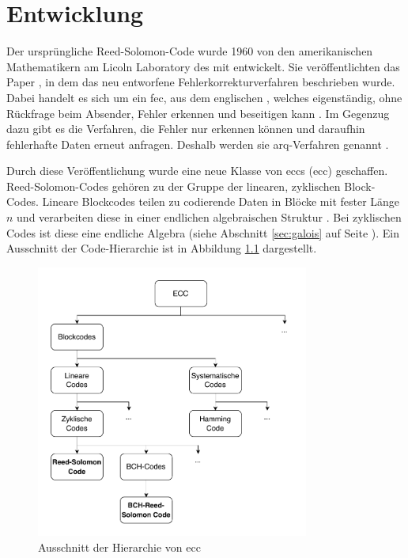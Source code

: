 \chapter{Entwicklung}\label{ch:development}

Der ursprüngliche Reed-Solomon-Code wurde 1960 von den amerikanischen Mathematikern am Licoln Laboratory des \acrshort{mit} entwickelt.
Sie veröffentlichten das Paper , in dem das neu entworfene Fehlerkorrekturverfahren beschrieben wurde.
Dabei handelt es sich um ein \acrfull{fec}, aus dem englischen , welches eigenständig, ohne Rückfrage beim Absender, Fehler erkennen und beseitigen kann \cite[Kapitel 1.1]{friedrichsKanalcodierung1996}.
Im Gegenzug dazu gibt es die Verfahren, die Fehler nur erkennen können und daraufhin fehlerhafte Daten erneut anfragen. Deshalb werden sie \acrfull{arq}-Verfahren genannt \cite[Kapitel 2.1]{geiselTutorialReedSolomonError1990}.

Durch diese Veröffentlichung wurde eine neue Klasse von \acrlong{ecc}s (\acrshort{ecc}) geschaffen. 
Reed-Solomon-Codes gehören zu der Gruppe der linearen, zyklischen Block-Codes. 
Lineare Blockcodes teilen zu codierende Daten in Blöcke mit fester Länge \(n\) und verarbeiten diese in einer endlichen algebraischen Struktur \cite[Kapitel 3]{friedrichsKanalcodierung1996}. 
Bei zyklischen Codes ist diese eine endliche Algebra (siehe Abschnitt \ref{sec:galois} auf Seite \pageref{sec:galois}).
Ein Ausschnitt der Code-Hierarchie ist in Abbildung \ref{fig:eccHierarchy} dargestellt.

\begin{figure}[ht]
	\centering
	\includegraphics[width=0.8\textwidth]{figures/Codeklassen.drawio.pdf}
	\caption{Ausschnitt der Hierarchie von \acrshort{ecc}}
	\label{fig:eccHierarchy}
\end{figure}

